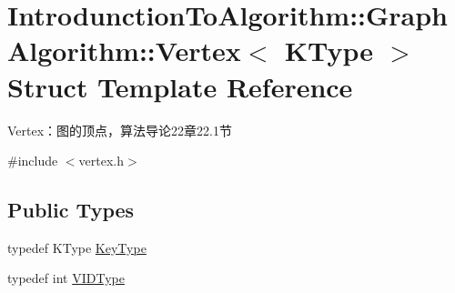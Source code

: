\hypertarget{struct_introdunction_to_algorithm_1_1_graph_algorithm_1_1_vertex}{}\section{Introdunction\+To\+Algorithm\+:\+:Graph\+Algorithm\+:\+:Vertex$<$ K\+Type $>$ Struct Template Reference}
\label{struct_introdunction_to_algorithm_1_1_graph_algorithm_1_1_vertex}


Vertex：图的顶点，算法导论22章22.1节  




{\ttfamily \#include $<$vertex.\+h$>$}

\subsection*{Public Types}
\begin{DoxyCompactItemize}
\item 
typedef K\+Type \hyperlink{struct_introdunction_to_algorithm_1_1_graph_algorithm_1_1_vertex_ada86f69d9e5f5dcb47b7be1e3a208d06}{Key\+Type}
\item 
typedef int \hyperlink{struct_introdunction_to_algorithm_1_1_graph_algorithm_1_1_vertex_ac1913974a4b8371c5a896b098ebf152e}{V\+I\+D\+Type}
\end{DoxyCompactItemize}
